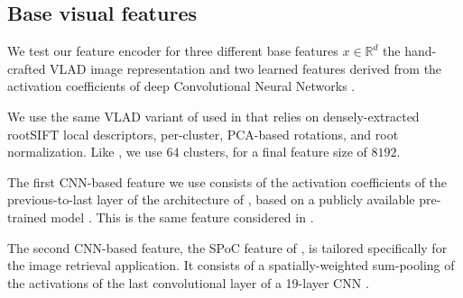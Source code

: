 \subsection{Base visual features}
We test our feature encoder for three different base features $x\in\mathbb{R}^d$ the hand-crafted VLAD image representation \cite{Delhumeau2013} and two learned features derived from the activation coefficients of deep Convolutional Neural Networks \cite{Krizhevsky2012,babenko15}.

We use the same VLAD variant of \cite{Delhumeau2013} used in \cite{ZePe15} that relies on densely-extracted rootSIFT \cite{3things} local descriptors, per-cluster, PCA-based rotations, and root normalization. Like \cite{ZePe15}, we use $64$ clusters, for a final feature size of $8192$.

The first CNN-based feature we use consists of the activation coefficients of the previous-to-last layer of the architecture of \cite{Krizhevsky2012}, based on a publicly available pre-trained model \cite{jia2014caffe}. This is the same feature considered in \cite{ZePe15}.

The second CNN-based feature, the SPoC feature of \cite{babenko15}, is tailored specifically for the image retrieval application. It consists of a spatially-weighted sum-pooling of the activations of the last convolutional layer of a 19-layer CNN \cite{Simonyan2014}.



